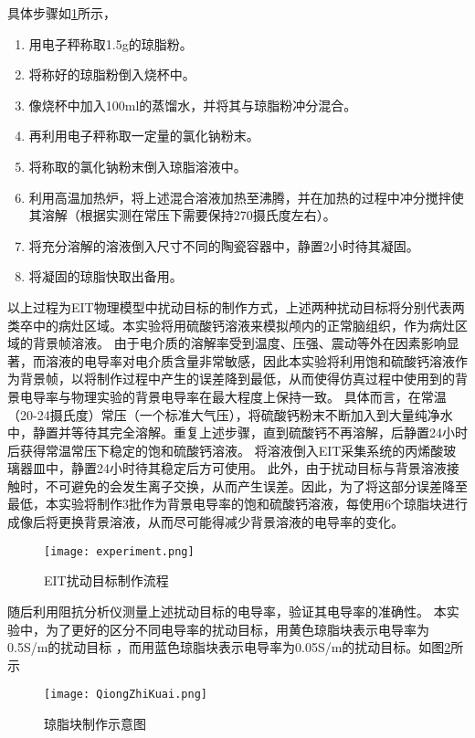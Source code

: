 具体步骤如\cref{figure:experiment}所示，
\begin{enumerate}
    \item 用电子秤称取1.5g的琼脂粉。
    \item 将称好的琼脂粉倒入烧杯中。
    \item 像烧杯中加入100ml的蒸馏水，并将其与琼脂粉冲分混合。
    \item 再利用电子秤称取一定量的氯化钠粉末。
    \item 将称取的氯化钠粉末倒入琼脂溶液中。
    \item 利用高温加热炉，将上述混合溶液加热至沸腾，并在加热的过程中冲分搅拌使其溶解（根据实测在常压下需要保持270摄氏度左右）。
    \item 将充分溶解的溶液倒入尺寸不同的陶瓷容器中，静置2小时待其凝固。
    \item 将凝固的琼脂快取出备用。
\end{enumerate}

以上过程为EIT物理模型中扰动目标的制作方式，上述两种扰动目标将分别代表两类卒中的病灶区域。本实验将用硫酸钙溶液来模拟颅内的正常脑组织，作为病灶区域的背景帧溶液。
由于电介质的溶解率受到温度、压强、震动等外在因素影响显著，而溶液的电导率对电介质含量非常敏感，因此本实验将利用饱和硫酸钙溶液作为背景帧，以将制作过程中产生的误差降到最低，从而使得仿真过程中使用到的背景电导率与物理实验的背景电导率在最大程度上保持一致。
具体而言，在常温（20-24摄氏度）常压（一个标准大气压），将硫酸钙粉末不断加入到大量纯净水中，静置并等待其完全溶解。重复上述步骤，直到硫酸钙不再溶解，后静置24小时后获得常温常压下稳定的饱和硫酸钙溶液。
将溶液倒入EIT采集系统的丙烯酸玻璃器皿中，静置24小时待其稳定后方可使用。
此外，由于扰动目标与背景溶液接触时，不可避免的会发生离子交换，从而产生误差。因此，为了将这部分误差降至最低，本实验将制作3批作为背景电导率的饱和硫酸钙溶液，每使用6个琼脂块进行成像后将更换背景溶液，从而尽可能得减少背景溶液的电导率的变化。



\begin{figure}[H]
    \centering
    \texttt{[image: experiment.png]}
    \caption{EIT扰动目标制作流程}
    \label{figure:experiment}
\end{figure}

随后利用阻抗分析仪测量上述扰动目标的电导率，验证其电导率的准确性。
本实验中，为了更好的区分不同电导率的扰动目标，用黄色琼脂块表示电导率为0.5S/m的扰动目标
，而用蓝色琼脂块表示电导率为0.05S/m的扰动目标。如图\cref{figure:QiongZhiKuai}所示

\begin{figure}[h]
    \centering

    \texttt{[image: QiongZhiKuai.png]}
    \caption{琼脂块制作示意图}
    \label{figure:QiongZhiKuai}
\end{figure}


